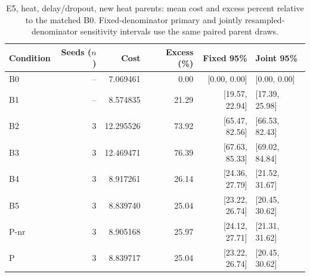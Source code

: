\begin{table}[ht]
\centering\small
\caption{E5, heat, delay/dropout, new heat parents: mean cost and excess percent relative to the matched B0. Fixed-denominator primary and jointly resampled-denominator sensitivity intervals use the same paired parent draws.}\label{tab:revision_cost_E5_heat_locked_delay_dropout}
\begin{tabular}{@{}lrrrrl@{}}\toprule
Condition & Seeds ($n$) & Cost & Excess (\%) & Fixed 95\% & Joint 95\%\\\midrule
B0 & -- & 7.069461 & 0.00 & [0.00, 0.00] & [0.00, 0.00]\\
B1 & -- & 8.574835 & 21.29 & [19.57, 22.94] & [17.39, 25.98]\\
B2 & 3 & 12.295526 & 73.92 & [65.47, 82.56] & [66.53, 82.43]\\
B3 & 3 & 12.469471 & 76.39 & [67.63, 85.33] & [69.02, 84.84]\\
B4 & 3 & 8.917261 & 26.14 & [24.36, 27.79] & [21.52, 31.67]\\
B5 & 3 & 8.839740 & 25.04 & [23.22, 26.74] & [20.45, 30.62]\\
P-nr & 3 & 8.905168 & 25.97 & [24.12, 27.71] & [21.31, 31.62]\\
P & 3 & 8.839717 & 25.04 & [23.22, 26.74] & [20.45, 30.62]\\
\bottomrule\end{tabular}
\end{table}
